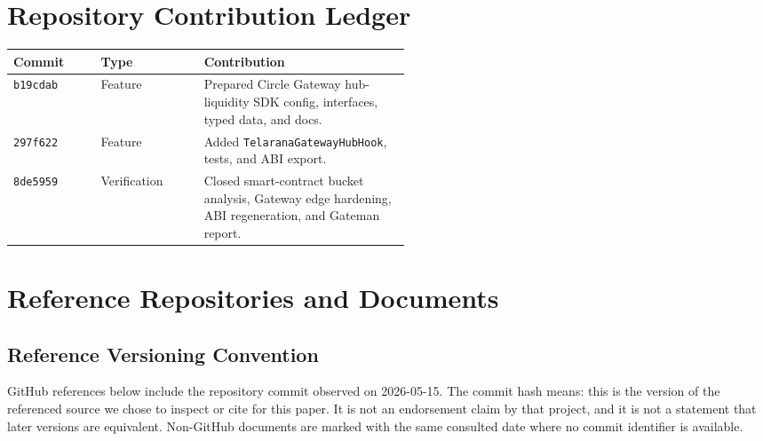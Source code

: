 \documentclass[11pt]{article}
\begin{document}
\section{Repository Contribution Ledger}

\begin{center}
\begin{tabular}{llp{0.52\linewidth}}
\toprule
Commit & Type & Contribution \\
\midrule
\texttt{b19cdab} & Feature & Prepared Circle Gateway hub-liquidity SDK
config, interfaces, typed data, and docs. \\
\texttt{297f622} & Feature & Added \texttt{TelaranaGatewayHubHook}, tests,
and ABI export. \\
\texttt{8de5959} & Verification & Closed smart-contract bucket analysis,
Gateway edge hardening, ABI regeneration, and Gateman report. \\
\bottomrule
\end{tabular}
\end{center}

\section{Reference Repositories and Documents}

\subsection*{Reference Versioning Convention}

GitHub references below include the repository commit observed on
2026-05-15. The commit hash means: this is the version of the referenced source
we chose to inspect or cite for this paper. It is not an endorsement claim by
that project, and it is not a statement that later versions are equivalent.
Non-GitHub documents are marked with the same consulted date where no commit
identifier is available.
\end{document}
